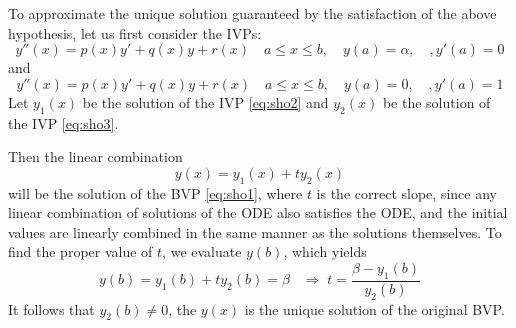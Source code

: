 \documentclass[../main-sheet.tex]{subfiles}
\begin{document}
To approximate the unique solution guaranteed by the satisfaction of the above hypothesis, let us first consider the IVPs:
\begin{equation}
    y''(x)=p(x)y'+q(x)y+r(x)\quad a\leq x\leq b,\quad y(a)=\alpha,\quad, y'(a)=0 \label{eq:sho2}
\end{equation}
and
\begin{equation}
    y''(x)=p(x)y'+q(x)y+r(x)\quad a\leq x\leq b,\quad y(a)=0,\quad, y'(a)=1 \label{eq:sho3}
\end{equation}
Let \(y_1(x)\) be the solution of the IVP \eqref{eq:sho2} and \(y_2(x)\) be the solution of the IVP \eqref{eq:sho3}.

Then the linear combination
\begin{equation}
    y(x)=y_1(x)+ty_2(x) \label{eq:sho4}
\end{equation}
will be the solution of the BVP \eqref{eq:sho1}, where \(t\) is the correct slope, since any linear combination of solutions of the ODE also satisfies the ODE, and the initial values are linearly combined in the same manner as the solutions themselves. To find the proper value of \(t\), we evaluate \(y(b)\), which yields
\begin{equation}
    y(b)=y_1(b)+ty_2(b)=\beta\;\;\;\Rightarrow\;t=\frac{\beta-y_1(b)}{y_2(b)}\label{eq:sho5}
\end{equation}
It follows that \(y_2(b)\neq 0\), the \(y(x)\) is the unique solution of the original BVP.
\end{document}
